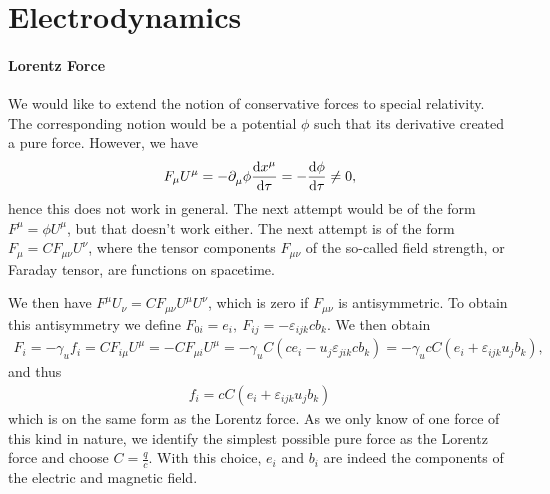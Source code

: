 \section{Electrodynamics}

\paragraph{Lorentz Force}
We would like to extend the notion of conservative forces to special relativity. The corresponding notion would be a potential $\phi$ such that its derivative created a pure force. However, we have
\begin{align*}
	F_{\mu}U^{\mu} = -\partial^{}_{\mu}\phi\dv{x^{\mu}}{\tau} = -\dv{\phi}{\tau} \neq 0,
\end{align*}
hence this does not work in general. The next attempt would be of the form $F^{\mu} = \phi U^{\mu}$, but that doesn't work either. The next attempt is of the form $F_{\mu} = CF_{\mu\nu}U^{\nu}$, where the tensor components $F_{\mu\nu}$ of the so-called field strength, or Faraday tensor, are functions on spacetime.

We then have $F^{\mu}U_{\nu} = CF_{\mu\nu}U^{\mu}U^{\nu}$, which is zero if $F_{\mu\nu}$ is antisymmetric. To obtain this antisymmetry we define $F_{0i} = e_{i},\ F_{ij} = -\varepsilon_{ijk}cb_{k}$. We then obtain
\begin{align*}
	F_{i} = -\gamma_{u}f_{i} = CF_{i\mu}U^{\mu} = -CF_{\mu i}U^{\mu} = -\gamma_{u}C(ce_{i} - u_{j}\varepsilon_{jik}cb_{k}) = -\gamma_{u}cC(e_{i} + \varepsilon_{ijk}u_{j}b_{k}),
\end{align*}
and thus
\begin{align*}
	f_{i} = cC(e_{i} + \varepsilon_{ijk}u_{j}b_{k})
\end{align*}
which is on the same form as the Lorentz force. As we only know of one force of this kind in nature, we identify the simplest possible pure force as the Lorentz force and choose $C = \frac{q}{c}$. With this choice, $e_{i}$ and $b_{i}$ are indeed the components of the electric and magnetic field.

